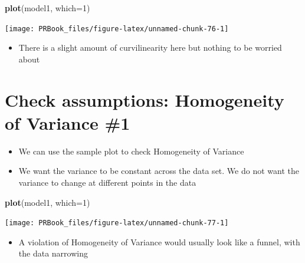 \documentclass[
]{book}
\newenvironment{Shaded}{\begin{snugshade}}{\end{snugshade}}
\newcommand{\DataTypeTok}[1]{\textcolor[rgb]{0.13,0.29,0.53}{#1}}
\newcommand{\DecValTok}[1]{\textcolor[rgb]{0.00,0.00,0.81}{#1}}
\newcommand{\KeywordTok}[1]{\textcolor[rgb]{0.13,0.29,0.53}{\textbf{#1}}}
\newcommand{\NormalTok}[1]{#1}
\providecommand{\tightlist}{%
  \setlength{\itemsep}{0pt}\setlength{\parskip}{0pt}}
\begin{document}
\begin{Shaded}
\begin{Highlighting}[]
\KeywordTok{plot}\NormalTok{(model1, }\DataTypeTok{which=}\DecValTok{1}\NormalTok{)}
\end{Highlighting}
\end{Shaded}

\begin{center}\texttt{[image: PRBook\_files/figure-latex/unnamed-chunk-76-1]} \end{center}

\begin{itemize}
\tightlist
\item
  There is a slight amount of curvilinearity here but nothing to be worried about
\end{itemize}

\hypertarget{check-assumptions-homogeneity-of-variance-1}{%
\section{Check assumptions: Homogeneity of Variance \#1}\label{check-assumptions-homogeneity-of-variance-1}}

\begin{itemize}
\tightlist
\item
  We can use the sample plot to check Homogeneity of Variance
\item
  We want the variance to be constant across the data set. We do not want the variance to change at different points in the data
\end{itemize}

\begin{Shaded}
\begin{Highlighting}[]
\KeywordTok{plot}\NormalTok{(model1, }\DataTypeTok{which=}\DecValTok{1}\NormalTok{)}
\end{Highlighting}
\end{Shaded}

\begin{center}\texttt{[image: PRBook\_files/figure-latex/unnamed-chunk-77-1]} \end{center}

\begin{itemize}
\tightlist
\item
  A violation of Homogeneity of Variance would usually look like a funnel, with the data narrowing
\end{itemize}
\end{document}
